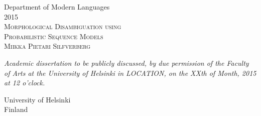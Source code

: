 \begin{titlepage}
\begin{center}
Department of Modern Languages\\
2015\\
\vspace*{\fill}
\textsc{\LARGE Morphological Disambiguation using}\\[0.5cm]
\textsc{\LARGE Probabilistic Sequence Models}\\
\vspace*{\fill}
\textsc{\large Miikka Pietari Silfverberg}\\
\vspace*{\fill}
\end{center}
{\it Academic dissertation to be publicly discussed, by due permission of
the Faculty of Arts at the University of Helsinki in
LOCATION, on the XXth of Month, 2015 at 12 o{’}clock.}\\
\vspace*{\fill}
\begin{center}
University of Helsinki\\
Finland
\end{center}
\end{titlepage}
